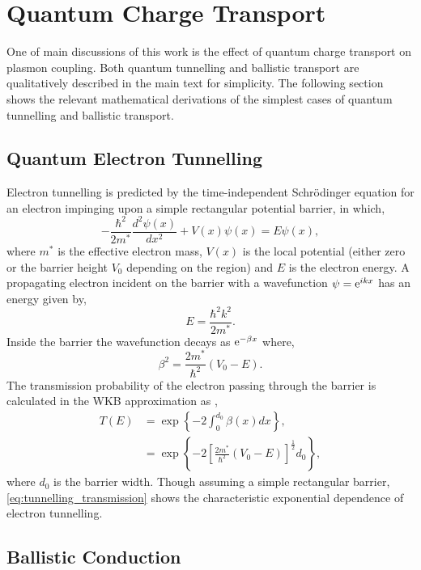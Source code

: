 \documentclass[12pt, a4paper, oneside]{book}
\begin{document}
\section{Quantum Charge Transport}

One of main discussions of this work is the effect of quantum charge transport on plasmon coupling. Both quantum tunnelling and ballistic transport are qualitatively described in the main text for simplicity. The following section shows the relevant mathematical derivations of the simplest cases of quantum tunnelling and ballistic transport.

\subsection{Quantum Electron Tunnelling}

Electron tunnelling is predicted by the time-independent Schr\"{o}dinger equation for an electron impinging upon a simple rectangular potential barrier, in which,
\begin{equation}
	-\frac{\hbar^2}{2m^*}\frac{d^2\psi(x)}{dx^2} + V(x)\psi(x) = E\psi(x),
\end{equation}
where $m^*$ is the effective electron mass, $V(x)$ is the local potential (either zero or the barrier height $V_0$ depending on the region) and $E$ is the electron energy. A propagating electron incident on the barrier with a wavefunction $\psi = \mathrm{e}^{ikx}$ has an energy given by,
\begin{equation}
	E = \frac{\hbar^2k^2}{2m^*}.
\end{equation}
Inside the barrier the wavefunction decays as $\mathrm{e}^{-\beta x}$ where,
\begin{equation}
	\beta^2 = \frac{2m^*}{\hbar^2}(V_0 - E).
\end{equation}
The transmission probability of the electron passing through the barrier is calculated in the WKB approximation as \cite{griffiths2005introduction},
\begin{align}
	T(E) &= \exp \left\{ -2 \int_0^{d_0} \beta(x) dx \right\}, \\
	&= \exp \left\{ -2 \left[\frac{2m^*}{\hbar^2}(V_0 - E)\right]^{\frac{1}{2}} d_0 \right\}, \label{eq:tunnelling_transmission}
\end{align}
where $d_0$ is the barrier width. Though assuming a simple rectangular barrier, \eqref{eq:tunnelling_transmission} shows the characteristic exponential dependence of electron tunnelling.

\subsection{Ballistic Conduction}
\end{document}
